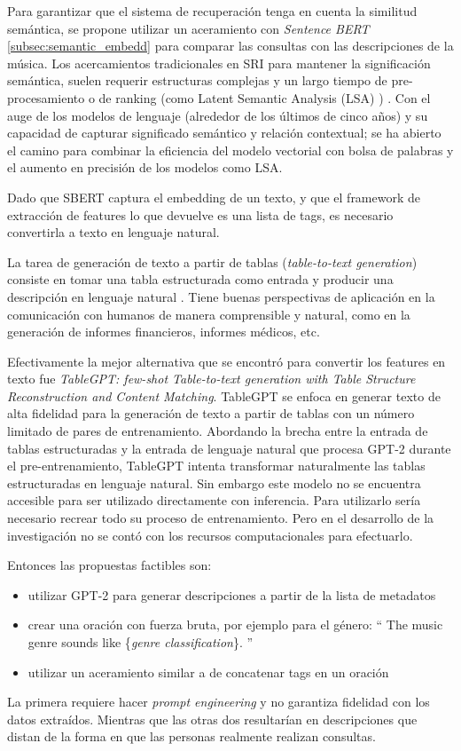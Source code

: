 Para garantizar que el sistema de recuperación tenga en cuenta la similitud semántica, se propone utilizar un aceramiento con \textit{Sentence BERT} \ref{subsec:semantic_embedd} para comparar las consultas con las descripciones de la música. Los acercamientos tradicionales en SRI para mantener la significación semántica, suelen requerir estructuras complejas y un largo tiempo de pre-procesamiento o de ranking (como Latent Semantic Analysis (LSA) \cite{Foltz1996LatentSA}) . Con el auge de los modelos de lenguaje (alrededor de los últimos de cinco años) y su capacidad de capturar significado semántico y relación contextual; se ha abierto el camino para combinar la eficiencia del modelo vectorial con bolsa de palabras y el aumento en precisión de los modelos como LSA. 

Dado que SBERT captura el embedding de un texto, y que el framework de extracción de features lo que devuelve es una lista de tags, es necesario convertirla a texto en lenguaje natural.  

La tarea de generación de texto a partir de tablas (\textit{table-to-text generation}) consiste en tomar una tabla estructurada como entrada y producir una descripción en lenguaje natural \cite{Yang2021TableTT}. Tiene buenas perspectivas de aplicación en la comunicación con humanos de manera comprensible y natural, como en la generación de informes financieros, informes médicos, etc. 

Efectivamente la mejor alternativa que se encontró para convertir los features en texto fue \textit{TableGPT: few-shot Table-to-text generation with Table Structure Reconstruction and Content Matching}. TableGPT \cite{Gong2020TableGPTFT} se enfoca en generar texto de alta fidelidad para la generación de texto a partir de tablas con un número limitado de pares de entrenamiento. Abordando la brecha entre la entrada de tablas estructuradas y la entrada de lenguaje natural que procesa GPT-2 durante el pre-entrenamiento, TableGPT intenta transformar naturalmente las tablas estructuradas en lenguaje natural. Sin embargo este modelo no se encuentra accesible para ser utilizado directamente con inferencia. Para utilizarlo sería necesario recrear todo su proceso de entrenamiento. Pero en el desarrollo de la investigación no se contó con los recursos computacionales para efectuarlo.

Entonces las propuestas factibles son: 
\begin{itemize}
    \item utilizar GPT-2 para generar descripciones a partir de la lista de metadatos
    \item crear una oración con fuerza bruta, por ejemplo para el género: `` The music genre sounds like \{\textit{genre classification}\}. ''
    \item utilizar un aceramiento similar a \cite{Manco2022ContrastiveAL} de concatenar tags en un oración
\end{itemize}
La primera requiere hacer \textit{prompt engineering} y no garantiza fidelidad con los datos extraídos. Mientras que las otras dos resultarían en descripciones que distan de la forma en que las personas realmente realizan consultas. 

